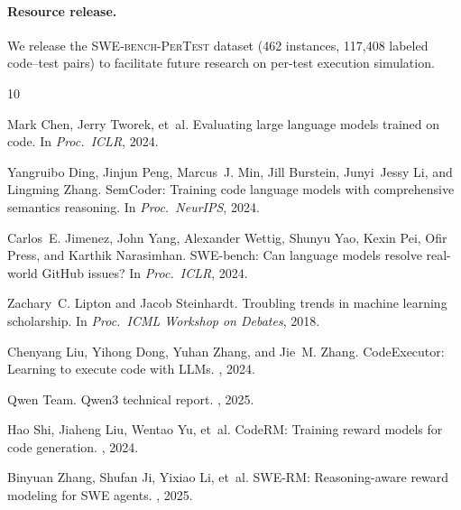 \documentclass[11pt,a4paper]{article}
\begin{document}
\paragraph{Resource release.}
We release the \textsc{SWE-bench-PerTest} dataset (462 instances, 117{,}408 labeled code--test pairs) to facilitate future research on per-test execution simulation.

\begin{thebibliography}{10}

Mark Chen, Jerry Tworek, et~al.
\newblock Evaluating large language models trained on code.
\newblock In {\em Proc.\ ICLR}, 2024.

Yangruibo Ding, Jinjun Peng, Marcus~J. Min, Jill Burstein, Junyi~Jessy Li, and Lingming Zhang.
\newblock SemCoder: Training code language models with comprehensive semantics reasoning.
\newblock In {\em Proc.\ NeurIPS}, 2024.

Carlos~E. Jimenez, John Yang, Alexander Wettig, Shunyu Yao, Kexin Pei, Ofir Press, and Karthik Narasimhan.
\newblock SWE-bench: Can language models resolve real-world GitHub issues?
\newblock In {\em Proc.\ ICLR}, 2024.

Zachary~C. Lipton and Jacob Steinhardt.
\newblock Troubling trends in machine learning scholarship.
\newblock In {\em Proc.\ ICML Workshop on Debates}, 2018.

Chenyang Liu, Yihong Dong, Yuhan Zhang, and Jie~M. Zhang.
\newblock CodeExecutor: Learning to execute code with LLMs.
, 2024.

Qwen Team.
\newblock Qwen3 technical report.
, 2025.

Hao Shi, Jiaheng Liu, Wentao Yu, et~al.
\newblock CodeRM: Training reward models for code generation.
, 2024.

Binyuan Zhang, Shufan Ji, Yixiao Li, et~al.
\newblock SWE-RM: Reasoning-aware reward modeling for SWE agents.
, 2025.

\end{thebibliography}
\end{document}
